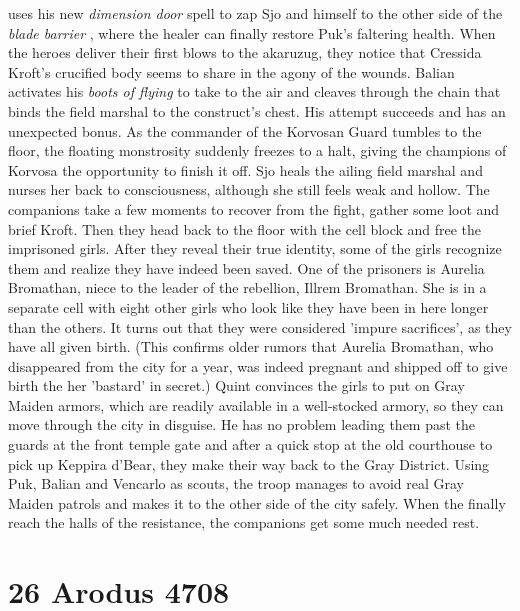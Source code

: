 uses his new {\itshape dimension door} spell to zap Sjo and himself to the other side of the  {\itshape blade barrier} , where the healer can finally restore Puk's faltering health. When the heroes deliver their first blows to the akaruzug, they notice that Cressida Kroft's crucified body seems to share in the agony of the wounds. Balian activates his  {\itshape boots of flying} to take to the air and cleaves through the chain that binds the field marshal to the construct's chest. His attempt succeeds and has an unexpected bonus. As the commander of the Korvosan Guard tumbles to the floor, the floating monstrosity suddenly freezes to a halt, giving the champions of Korvosa the opportunity to finish it off. Sjo heals the ailing field marshal and nurses her back to consciousness, although she still feels weak and hollow. The companions take a few moments to recover from the fight, gather some loot and brief Kroft. Then they head back to the floor with the cell block and free the imprisoned girls. After they reveal their true identity, some of the girls recognize them and realize they have indeed been saved. One of the prisoners is Aurelia Bromathan, niece to the leader of the rebellion, Illrem Bromathan. She is in a separate cell with eight other girls who look like they have been in here longer than the others. It turns out that they were considered 'impure sacrifices', as they have all given birth. (This confirms older rumors that Aurelia Bromathan, who disappeared from the city for a year, was indeed pregnant and shipped off to give birth the her 'bastard' in secret.) Quint convinces the girls to put on Gray Maiden armors, which are readily available in a well-stocked armory, so they can move through the city in disguise. He has no problem leading them past the guards at the front temple gate and after a quick stop at the old courthouse to pick up Keppira d'Bear, they make their way back to the Gray District. Using Puk, Balian and Vencarlo as scouts, the troop manages to avoid real Gray Maiden patrols and makes it to the other side of the city safely. When the finally reach the halls of the resistance, the companions get some much needed rest.\\

\section{26 Arodus 4708}

